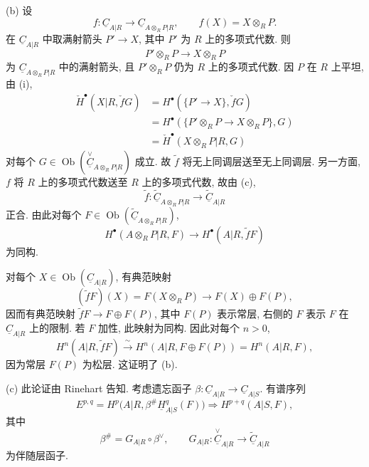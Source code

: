 (b) 设
\[
 f:\underline C_{A|R}\longrightarrow
 \underline C_{A\otimes_RP|R},
 \qquad f(X)=X\otimes_RP.
\]
在 $\underline C_{A|R}$ 中取满射箭头 $P'\longrightarrow X$,
其中 $P'$ 为 $R$ 上的多项式代数. 则
\[
 P'\otimes_RP\longrightarrow X\otimes_RP
\]
为 $\underline C_{A\otimes_RP|R}$ 中的满射箭头,
且 $P'\otimes_RP$ 仍为 $R$ 上的多项式代数.
因 $P$ 在 $R$ 上平坦, 由 (i),
\begin{align*}
 \check H^{\bullet}(X|R,\check fG)
 &=H^{\bullet}(\{P'\longrightarrow X\},\check fG)\\
 &=H^{\bullet}(\{P'\otimes_RP\longrightarrow X\otimes_RP\},G)\\
 &=\check H^{\bullet}(X\otimes_RP|R,G)
\end{align*}
对每个 $G\in\operatorname{Ob}(\overset{\vee}{\underline C}_{A\otimes_RP|R})$ 成立.
故 $\widetilde f$ 将无上同调层送至无上同调层.
另一方面, $f$ 将 $R$ 上的多项式代数送至 $R$ 上的多项式代数, 故由
(c),
\[
 \widetilde f:\widetilde{\underline C}_{A\otimes_RP|R}
 \longrightarrow\widetilde{\underline C}_{A|R}
\]
正合. 由此对每个 $F\in\operatorname{Ob}(\widetilde{\underline C}_{A\otimes_RP|R})$,
\[
 H^{\bullet}(A\otimes_RP|R,F)
 \longrightarrow H^{\bullet}(A|R,\widetilde fF)
\]
为同构.

对每个 $X\in\operatorname{Ob}(\underline C_{A|R})$, 有典范映射
\[
 (\widetilde fF)(X)=F(X\otimes_RP)
 \longrightarrow F(X)\oplus F(P),
\]
因而有典范映射 $\widetilde fF\longrightarrow F\oplus F(P)$,
其中 $F(P)$ 表示常层, 右侧的 $F$ 表示 $F$ 在 $\underline C_{A|R}$ 上的限制.
若 $F$ 加性, 此映射为同构. 因此对每个 $n>0$,
\[
 H^n(A|R,\widetilde fF)
 \xrightarrow{\ \sim\ }
 H^n(A|R,F\oplus F(P))=H^n(A|R,F),
\]
因为常层 $F(P)$ 为松层. 这证明了 (b).


(c) 此论证由 Rinehart 告知.
考虑遗忘函子 $\beta:\underline C_{A|R}\longrightarrow\underline C_{A|S}$.
有谱序列
\[
 E^{p,q}=H^p\bigl(A|R,
 \beta^{\#}\underline H^q_{A|S}(F)\bigr)
 \Longrightarrow H^{p+q}(A|S,F),
\]
其中
\[
 \beta^{\#}=G_{A|R}\circ\beta^{\vee},
 \qquad
 G_{A|R}:\overset{\vee}{\underline C}_{A|R}
 \longrightarrow\widetilde{\underline C}_{A|R}
\]
为伴随层函子.

